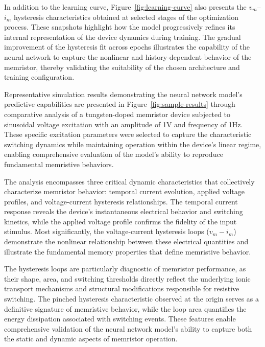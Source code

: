 \documentclass[11pt, oneside]{article}
\begin{document}
In addition to the learning curve, Figure~\ref{fig:learning-curve} also presents the $v_m$--$i_m$ hysteresis characteristics obtained at selected stages of the optimization process. These snapshots highlight how the model progressively refines its internal representation of the device dynamics during training. The gradual improvement of the hysteresis fit across epochs illustrates the capability of the neural network to capture the nonlinear and history-dependent behavior of the memristor, thereby validating the suitability of the chosen architecture and training configuration.









Representative simulation results demonstrating the neural network model's predictive capabilities are presented in Figure~\ref{fig:sample-results} through comparative analysis of a tungsten-doped memristor device subjected to sinusoidal voltage excitation with an amplitude of 1V and frequency of 1Hz. These specific excitation parameters were selected to capture the characteristic switching dynamics while maintaining operation within the device's linear regime, enabling comprehensive evaluation of the model's ability to reproduce fundamental memristive behaviors.

The analysis encompasses three critical dynamic characteristics that collectively characterize memristor behavior: temporal current evolution, applied voltage profiles, and voltage-current hysteresis relationships. The temporal current response reveals the device's instantaneous electrical behavior and switching kinetics, while the applied voltage profile confirms the fidelity of the input stimulus. Most significantly, the voltage-current hysteresis loops ($v_m - i_m$) demonstrate the nonlinear relationship between these electrical quantities and illustrate the fundamental memory properties that define memristive behavior.

The hysteresis loops are particularly diagnostic of memristor performance, as their shape, area, and switching thresholds directly reflect the underlying ionic transport mechanisms and structural modifications responsible for resistive switching. The pinched hysteresis characteristic observed at the origin serves as a definitive signature of memristive behavior, while the loop area quantifies the energy dissipation associated with switching events. These features enable comprehensive validation of the neural network model's ability to capture both the static and dynamic aspects of memristor operation.
\end{document}
